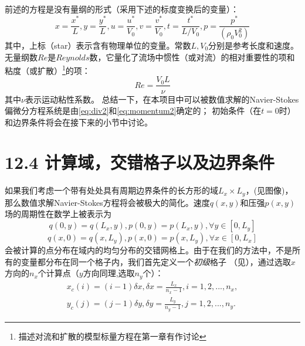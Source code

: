 \documentclass[nofonts]{ctexart} %
\begin{document}
 前述的方程是没有量纲的形式（采用下述的标度变换后的变量）：
\begin{equation}
x=\frac{x^*}{L},y=\frac{y^*}{L},u=\frac{u^*}{V_0},v=\frac{v^*}{V_0},t=\frac{t^*}{L/V_0}, p=\frac{p^*}{(\rho_0 V_0^2)}
\end{equation}
其中，上标（star）表示含有物理单位的变量。常数$L,V_0$分别是参考长度和速度。无量纲数$Re$是$Reynolds$数，它量化了流场中惯性（或对流）的相对重要性的项和粘度（或扩散）\footnote{描述对流和扩散的模型标量方程在第一章有作讨论}的项：
\begin{equation}
Re=\frac{V_0 L}{\nu}    
\end{equation}
其中$\nu$表示运动粘性系数。
总结一下，在本项目中可以被数值求解的Navier-Stokes偏微分方程系统是由\ref{eq:div2}和\ref{eq:momentum2}确定的；
初始条件（在$t=0$时）和边界条件将会在接下来的小节中讨论。
\section{12.4 计算域，交错格子以及边界条件}
如果我们考虑一个带有处处具有周期边界条件的长方形的域$L_x \times L_y$，(见图像)，那么数值求解Navier-Stokes方程将会被极大的简化。速度$q(x,y)$和压强$p(x,y)$场的周期性在数学上被表示为
\begin{equation}
q(0,y)=q(L_x,y),p(0,y)=p(L_x,y), \forall y\in [0,L_y]
\end{equation}
\begin{equation}
q(x,0)=q(x,L_y),p(x,0)=p(x,L_y), \forall x\in [0,L_x]
\end{equation}
会被计算的点分布在域内的均匀分布的交错网格上。由于在我们的方法中，不是所有的变量都分布在同一个格子内，我们首先定义一个\textit{初级}格子
（见），通过选取$x$方向的$n_x$个计算点（$y$方向同理,选取$n_y$个）：
\begin{align}
    x_c(i)=(i-1)\delta x, \delta x=\frac{L_x}{n_x-1}, i=1,2,...,n_x,\\
    y_c(j)=(j-1)\delta y, \delta y=\frac{L_y}{n_y-1}, j=1,2,...,n_y.
\end{align}
\end{document}
